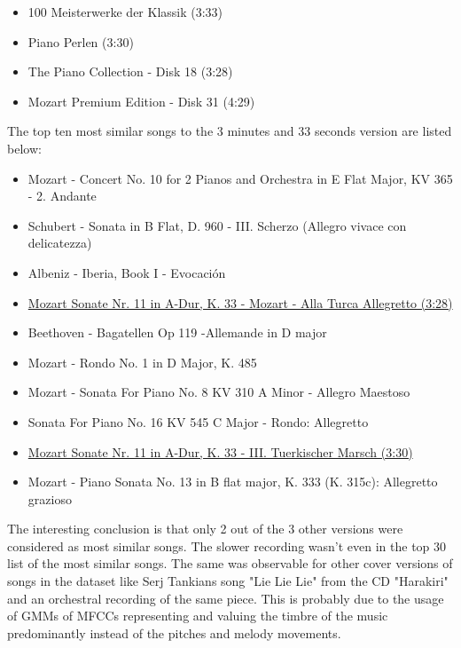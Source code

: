 \begin{itemize}
	\setlength\itemsep{-0.5em}
	\item 100 Meisterwerke der Klassik (3:33)
	\item Piano Perlen (3:30)
	\item The Piano Collection - Disk 18 (3:28)
	\item Mozart Premium Edition - Disk 31 (4:29)
	
\end{itemize}
The top ten most similar songs to the 3 minutes and 33 seconds version are listed below:
\begin{itemize}
	\setlength\itemsep{-0.5em}
	\item Mozart - Concert No. 10 for 2 Pianos and Orchestra in E Flat Major, KV 365 - 2. Andante
	\item Schubert - Sonata in B Flat, D. 960 - III. Scherzo (Allegro vivace con delicatezza)
	\item Albeniz - Iberia, Book I - Evocaci\'on
	\item \underline{Mozart Sonate Nr. 11 in A-Dur, K. 33 - Mozart - Alla Turca Allegretto (3:28)}
	\item Beethoven - Bagatellen Op 119 -Allemande in D major
	\item Mozart - Rondo No. 1 in D Major, K. 485
	\item Mozart - Sonata For Piano No. 8 KV 310 A Minor - Allegro Maestoso
	\item Sonata For Piano No. 16 KV 545 C Major - Rondo: Allegretto
	\item \underline{Mozart Sonate Nr. 11 in A-Dur, K. 33 - III. Tuerkischer Marsch (3:30)}
	\item Mozart - Piano Sonata No. 13 in B flat major, K. 333 (K. 315c): Allegretto grazioso
	
\end{itemize}
\noindent The interesting conclusion is that only 2 out of the 3 other versions were considered as most similar songs.
The slower recording wasn't even in the top 30 list of the most similar songs. 
The same was observable for other cover versions of songs in the dataset like Serj Tankians song "Lie Lie Lie" from the CD "Harakiri" and an orchestral recording of the same piece. 
This is probably due to the usage of GMMs of MFCCs representing and valuing the timbre of the music predominantly instead of the pitches and melody movements.

